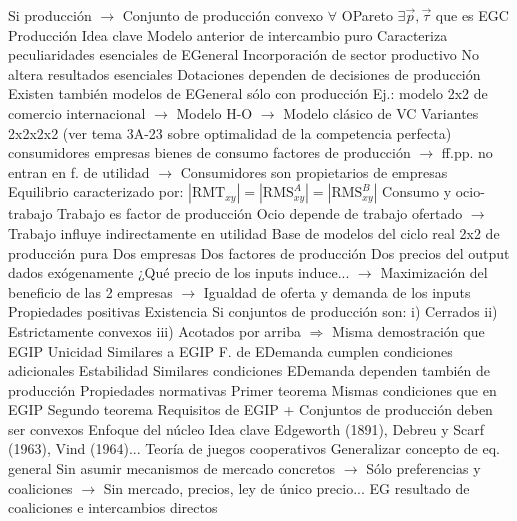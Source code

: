 \documentclass{nuevotema}
\begin{document}
\begin{esquemal}
				\4[] Si producción
				\4[] $\to$ Conjunto de producción convexo
				\4[$\Rightarrow$] $\forall$ OPareto $\exists \vec{p}, \vec{\tau}$ que es EGC
	\1 
		\2 Producción
			\3 Idea clave
				\4 Modelo anterior de intercambio puro
				\4[] Caracteriza peculiaridades esenciales de EGeneral
				\4 Incorporación de sector productivo
				\4[] No altera resultados esenciales
				\4[] Dotaciones dependen de decisiones de producción
				\4 Existen también modelos de EGeneral sólo con producción
				\4[] Ej.: modelo 2x2 de comercio internacional
				\4[] $\to$ Modelo H-O
				\4[] $\to$ Modelo clásico de VC
			\3 Variantes
				\4 2x2x2x2
				\4[] (ver tema 3A-23 sobre optimalidad de la competencia perfecta)
				 consumidores
				 empresas
				 bienes de consumo
				 factores de producción
				\4[] $\to$ ff.pp. no entran en f. de utilidad
				\4[] $\to$ Consumidores son propietarios de empresas
				\4[] Equilibrio caracterizado por:
				\4[] $\left| \text{RMT}_{xy} \right| = \left| \text{RMS}_{xy}^A \right| = \left| \text{RMS}_{xy}^B \right| $
				\4 Consumo y ocio-trabajo
				\4[] Trabajo es factor de producción
				\4[] Ocio depende de trabajo ofertado
				\4[] $\to$ Trabajo influye indirectamente en utilidad
				\4[] Base de modelos del ciclo real
				\4 2x2 de producción pura
				\4[] Dos empresas
				\4[] Dos factores de producción
				\4[] Dos precios del output dados exógenamente
				\4[] ¿Qué precio de los inputs induce...
				\4[] $\to$ Maximización del beneficio de las 2 empresas
				\4[] $\to$ Igualdad de oferta y demanda de los inputs
			\3 Propiedades positivas
				\4 Existencia
				\4[] Si conjuntos de producción son:
				\4[] i) Cerrados
				\4[] ii) Estrictamente convexos
				\4[] iii) Acotados por arriba
				\4[] $\Rightarrow$ Misma demostración que EGIP
				\4 Unicidad
				\4[] Similares a EGIP
				\4[] F. de EDemanda cumplen condiciones adicionales
				\4 Estabilidad
				\4[] Similares condiciones
				\4[] EDemanda dependen también de producción
			\3 Propiedades normativas
				\4 Primer teorema
				\4[] Mismas condiciones que en EGIP
				\4 Segundo teorema
				\4[] Requisitos de EGIP
				\4[] + Conjuntos de producción deben ser convexos
		\2 Enfoque del núcleo
			\3 Idea clave
				\4 Edgeworth (1891), Debreu y Scarf (1963), Vind (1964)...
				\4 Teoría de juegos cooperativos
				\4 Generalizar concepto de eq. general
				\4[] Sin asumir mecanismos de mercado concretos
				\4[] $\to$ Sólo preferencias y coaliciones
				\4[] $\to$ Sin mercado, precios, ley de único precio...
				\4[$\then$] EG resultado de coaliciones e intercambios directos

\end{esquemal}
\end{document}

